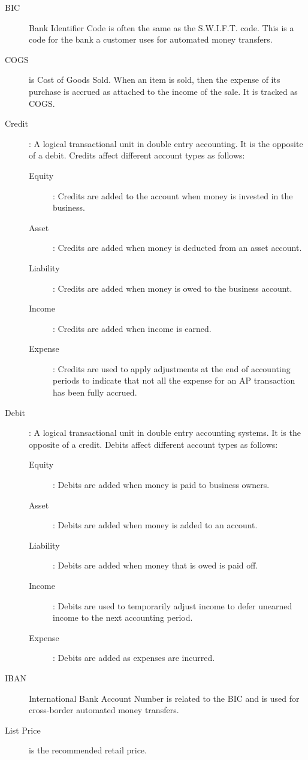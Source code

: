 \documentclass{article}
\begin{document}
\begin{description}
\item[BIC] Bank Identifier Code is often the same as the S.W.I.F.T. code.  This
is a code for the bank a customer uses for automated money transfers.
\item[COGS] is Cost of Goods Sold.  When an item is sold, then the expense of
its purchase is accrued as attached to the income of the sale.  It is tracked as
COGS.
\item[Credit]: A logical transactional unit in double entry accounting.  It is
the opposite of a debit.  Credits affect different account types as
follows:
  \begin{description}
  \item[Equity]:  Credits are added to the account when money is invested in the
	business.
  \item[Asset]:  Credits are added when money is deducted from an asset account.
  \item[Liability]:  Credits are added when money is owed to the business
	account.
  \item[Income]: Credits are added when income is earned.
  \item[Expense]: Credits are used to apply adjustments at the end of accounting
	periods to indicate that not all the expense for an AP transaction has
	been fully accrued.
  \end{description}
\item[Debit]: A logical transactional unit in double entry accounting systems.
It is the opposite of a credit.  Debits affect different account types as
follows:
  \begin{description}
  \item[Equity]:  Debits are added when money is paid to business owners.
  \item[Asset]:  Debits are added when money is added to an account.
  \item[Liability]:  Debits are added when money that is owed is paid off.
  \item[Income]:  Debits are used to temporarily adjust income to defer unearned
	income to the next accounting period.
  \item[Expense]: Debits are added as expenses are incurred.
  \end{description}
\item[IBAN]  International Bank Account Number is related to the BIC and is used
for cross-border automated money transfers.
\item[List Price] is the recommended retail price.

\end{description}
\end{document}
